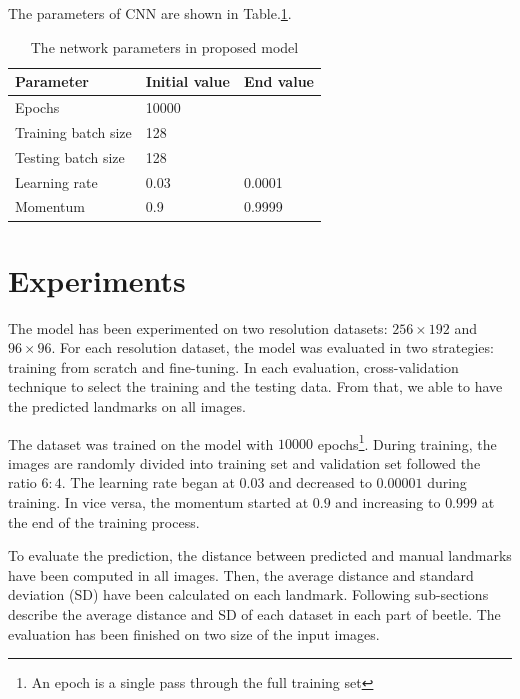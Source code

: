 \documentclass[12pt,a4paper]{article}
\begin{document}
The parameters of CNN are shown in Table.\ref{model2parameters}.
\begin{table}[h!]
	\centering
	\begin{tabular}{l l l}
	Parameter & Initial value & End value \\ \hline
	Epochs & 10000 &  \\ \hline
	Training batch size & 128 & \\ \hline
	Testing batch size & 128 & \\ \hline
	Learning rate & 0.03 & 0.0001 \\ \hline
	Momentum & 0.9 & 0.9999 \\ \hline
	\end{tabular}
	\caption{The network parameters in proposed model}
	\label{model2parameters}
\end{table}
\section{Experiments}
The model has been experimented on two resolution datasets: $256 \times 192$ and $96 \times 96$. For each resolution dataset, the model was evaluated in two strategies: training from scratch and fine-tuning. In each evaluation, cross-validation technique to select the training and the testing data. From that, we able to have the predicted landmarks on all images.

The dataset was trained on the model with $10000$ epochs\footnote{An epoch is a single pass through the full training set}. During training, the images are randomly divided into training set and validation set followed the ratio $6:4$. The learning rate began at $0.03$ and decreased to $0.00001$ during training. In vice versa, the momentum started at $0.9$ and increasing to $0.999$ at the end of the training process. 

To evaluate the prediction, the distance between predicted and manual landmarks have been computed in all images. Then, the average distance and standard deviation (SD) have been calculated on each landmark. Following sub-sections describe the average distance and SD of each dataset in each part of beetle. The evaluation has been finished on two size of the input images.
\end{document}
